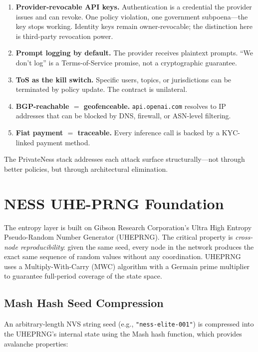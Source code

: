\documentclass[11pt,a4paper]{article}
\begin{document}
\begin{enumerate}[noitemsep]
  \item \textbf{Provider-revocable API keys.} Authentication is a credential the provider issues and can revoke. One policy violation, one government subpoena—the key stops working. Identity keys remain owner-revocable; the distinction here is third-party revocation power.
  \item \textbf{Prompt logging by default.} The provider receives plaintext prompts. ``We don't log'' is a Terms-of-Service promise, not a cryptographic guarantee.
  \item \textbf{ToS as the kill switch.} Specific users, topics, or jurisdictions can be terminated by policy update. The contract is unilateral.
  \item \textbf{BGP-reachable $=$ geofenceable.} \texttt{api.openai.com} resolves to IP addresses that can be blocked by DNS, firewall, or ASN-level filtering.
  \item \textbf{Fiat payment $=$ traceable.} Every inference call is backed by a KYC-linked payment method.
\end{enumerate}

The PrivateNess stack addresses each attack surface structurally—not through better policies, but through architectural elimination.

\section{NESS UHE-PRNG Foundation}
\label{sec:prng}

The entropy layer is built on Gibson Research Corporation's Ultra High Entropy Pseudo-Random Number Generator (UHEPRNG)\cite{grc-uheprng}. The critical property is \emph{cross-node reproducibility}: given the same seed, every node in the network produces the exact same sequence of random values without any coordination. UHEPRNG uses a Multiply-With-Carry (MWC) algorithm with a Germain prime multiplier to guarantee full-period coverage of the state space.

\subsection{Mash Hash Seed Compression}

An arbitrary-length NVS string seed (e.g., \texttt{"ness-elite-001"}) is compressed into the UHEPRNG's internal state using the Mash hash function, which provides avalanche properties:
\end{document}
